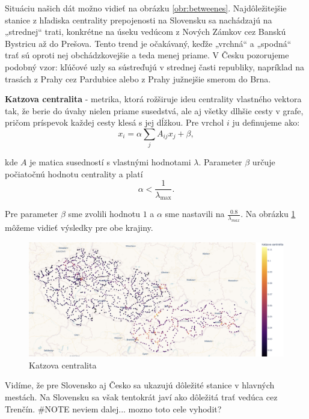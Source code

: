 \documentclass[main.tex]{subfiles}
\begin{document}
Situáciu našich dát možno vidieť na obrázku \ref{obr:betweenes}. Najdôležitejšie stanice z hľadiska centrality prepojenosti na Slovensku sa nachádzajú na „strednej“ trati, konkrétne na úseku vedúcom z Nových Zámkov cez Banskú Bystricu až do Prešova. Tento trend je očakávaný, keďže „vrchná“ a „spodná“ trať sú oproti nej obchádzkovejšie a teda menej priame. V Česku pozorujeme podobný vzor: kľúčové uzly sa sústreďujú v strednej časti republiky, napríklad na trasách z Prahy cez Pardubice alebo z Prahy južnejšie smerom do Brna.

\textbf{Katzova centralita} - metrika, ktorá rožširuje ideu centrality vlastného vektora tak, že berie do úvahy nielen priame susedstvá,  ale aj všetky dlhšie cesty v grafe, pričom príspevok každej cesty klesá s jej dĺžkou. Pre vrchol $i$ ju definujeme ako:
\begin{equation*}
    x_i = \alpha \sum_{j} A_{ij} x_j + \beta,
\end{equation*}

kde $A$ je matica susedností s vlastnými hodnotami $\lambda$.
Parameter $\beta$ určuje počiatočnú hodnotu centrality a platí
\begin{equation*}
    \alpha < \frac{1}{\lambda_{\max}}.    
\end{equation*}

Pre parameter $\beta$ sme zvolili hodnotu $1$ a $\alpha$ sme nastavili na $\frac{0.8}{\lambda_{max}}$. Na obrázku \ref{obr:katz} môžeme vidieť výsledky pre obe krajiny.

\begin{figure}
    \centerline{\includegraphics[width=1\textwidth]{images/katz.png}}
    \caption{Katzova centralita}
    \label{obr:katz}
\end{figure}

Vidíme, že pre Slovensko aj Česko sa ukazujú dôležité stanice v hlavných mestách. Na Slovensku sa však tentokrát javí ako dôležitá  trať vedúca cez Trenčín. \#NOTE neviem dalej... mozno toto cele vyhodit?
\end{document}
